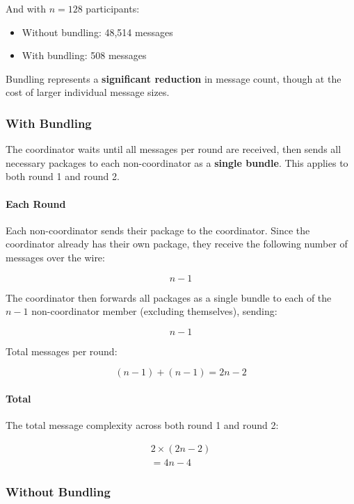 And with $n=128$ participants:
\begin{itemize}
    \item Without bundling: 48,514 messages
    \item With bundling: 508 messages
\end{itemize}

Bundling represents a \textbf{significant reduction} in message count, though at the cost of larger individual message sizes.

\subsubsection{With Bundling}

The coordinator waits until all messages per round are received, then sends all necessary packages to each non-coordinator as a \textbf{single bundle}. This applies to both round 1 and round 2.

\paragraph{Each Round}

Each non-coordinator sends their package to the coordinator. Since the coordinator already has their own package, they receive the following number of messages over the wire:

\[n-1\]

The coordinator then forwards all packages as a single bundle to each of the $n-1$ non-coordinator member (excluding themselves), sending:

\[n-1\]

Total messages per round:

\[(n-1)+(n-1) = 2n-2\]

\paragraph{Total}

The total message complexity across both round 1 and round 2:

\begin{equation}
\begin{aligned}
2\times (2n-2)\\ = 4n-4
\end{aligned}
\end{equation}

\subsubsection{Without Bundling}

